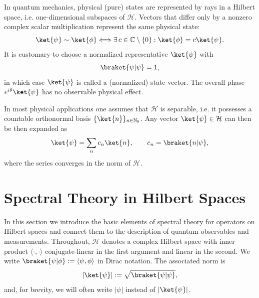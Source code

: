 In quantum mechanics, physical (pure) states are represented by rays in a Hilbert space, i.e. one-dimensional subspaces of $\mathcal{H}$. Vectors that differ only by a nonzero complex scalar multiplication represent the same physical state:
\begin{equation}
\ket{\psi}\sim\ket{\phi}\Longleftrightarrow\exists\,c\in\mathbb{C}\setminus\lbrace 0\rbrace:\ket{\phi}=c\ket{\psi}.
\end{equation}
It is customary to choose a normalized representative $\ket{\psi}$ with
\begin{equation}
\braket{\psi\vert\psi}=1,
\end{equation}
in which case $\ket{\psi}$ is called a (normalized) state vector. The overall phase $e^{i\theta}\ket{\psi}$ has no observable physical effect.

In most physical applications one assumes that $\mathcal{H}$ is separable, i.e. it possesses a countable orthonormal basis $\lbrace\ket{n}\rbrace_{n\in\mathbb{N}_0}$. Any vector $\ket{\psi}\in\mathcal{H}$ can then be then expanded as
\begin{equation}
\ket{\psi}=\sum_{n}c_n\ket{n},\qquad c_n=\braket{n\vert\psi},
\end{equation}
where the series converges in the norm of $\mathcal{H}$.

\section{Spectral Theory in Hilbert Spaces}\label{sec:spectral_theory_in_hilbert_spaces}
In this section we introduce the basic elements of spectral theory for operators on Hilbert spaces and connect them to the description of quantum observables and measurements. Throughout, $\mathcal{H}$ denotes a complex Hilbert space with inner product $\langle\cdot,\cdot\rangle$ conjugate-linear in the first argument and linear in the second. We write $\braket{\psi|\phi}:=\langle\psi,\phi\rangle$ in Dirac notation. The associated norm is
\begin{equation}
\lvert\ket{\psi}\rvert := \sqrt{\braket{\psi|\psi}},
\end{equation}
and, for brevity, we will often write $\lvert\psi\rvert$ instead of $\lvert\ket{\psi}\rvert$.
